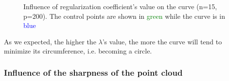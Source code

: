 \documentclass{article}
\begin{document}
\begin{figure}[H]
    \centering
    \caption[Influence of regularization coefficient's value on the curve]{Influence of regularization coefficient's value on the curve (n=15, p=200). The control points are shown in \textcolor{green}{green} while the curve is in \textcolor{blue}{blue}}
    \label{fig:bsp_res_lambda}
\end{figure}

As we expected, the higher the $\lambda$'s value, the more the curve will tend to minimize its circumference, i.e. becoming a circle. 

\subsubsection{Influence of the sharpness of the point cloud}
\end{document}
